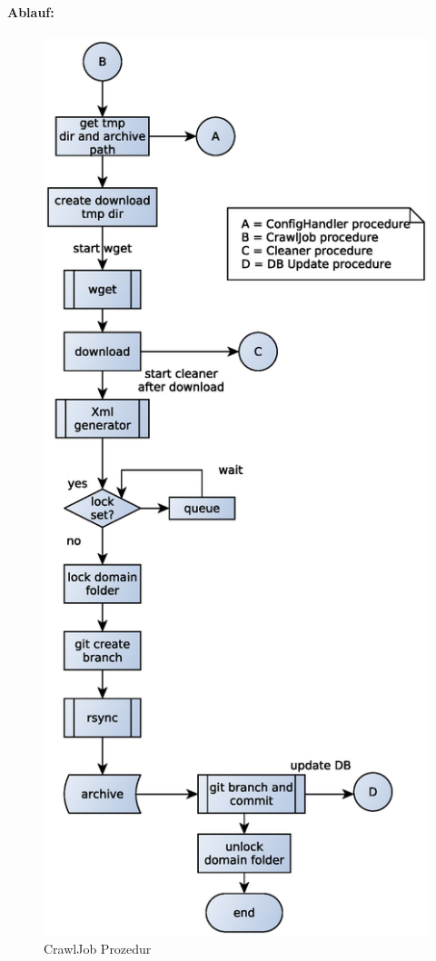 \paragraph{Ablauf:}
\label{par:ablauf_}
\begin{figure}[h]
	\centering
	\label{dia:design:backend:overview}
	\includegraphics[width=\textwidth]{design/backend/gfx/crawljob.eps}
	\caption{CrawlJob Prozedur}
\end{figure}


